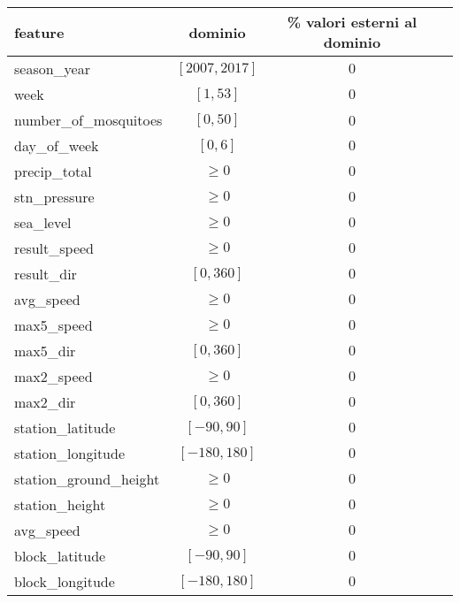 \vspace{.5em}
\begin{centering}
	\begin{tabular}{lccc}
		\toprule
		feature & dominio & \% valori esterni al dominio \\
		\midrule
		season\_year & $[2007, 2017]$ & $0$ \\
		week &	$[1, 53]$ & $0$ \\
		number\_of\_mosquitoes & $[0, 50]$ & 0 \\
		day\_of\_week &	$[0, 6]$ & $0$ \\
		precip\_total &	$\geq 0$ & $0$ \\
		stn\_pressure &	$\geq 0$ & $0$ \\
		sea\_level &	$\geq 0$ & $0$ \\
		result\_speed &	$\geq 0$ & $0$ \\
		result\_dir &	$[0, 360]$ & $0$ \\
		avg\_speed &	$\geq 0$ & $0$ \\
		max5\_speed &	$\geq 0$ & $0$ \\
		max5\_dir &	$[0, 360]$ & $0$ \\
		max2\_speed &	$\geq 0$ & $0$ \\
		max2\_dir &	$[0, 360]$ & $0$ \\
		station\_latitude & $[-90, 90]$ & $0$ \\
		station\_longitude & $[-180, 180]$ & $0$ \\
		station\_ground\_height &	$\geq 0$ & $0$ \\
		station\_height & $\geq 0$ & $0$ \\
		avg\_speed & $\geq 0$ & $0$ \\
		block\_latitude & $[-90, 90]$ & $0$ \\
		block\_longitude & $[-180, 180]$ & $0$ \\
		\bottomrule
	\end{tabular}
	\label{tab:features-accuracy}
\end{centering}
